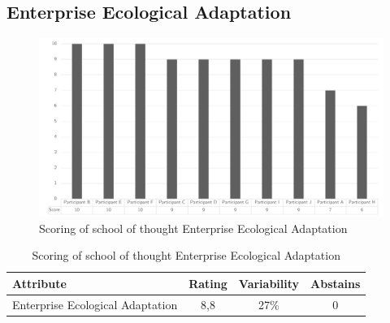 \subsection{Enterprise Ecological Adaptation}
\begin{figure}[h!]
	\centering
	\includegraphics[width=0.9\linewidth]{images/scoreeaschoolenterpriseecologicaladaptation}
	\caption[Scoring of school of thought Enterprise Ecological Adaptation]{Scoring of school of thought Enterprise Ecological Adaptation}
	\label{fig:appscoringschoolenterpriseecologicaladaptation}
\end{figure}
\begin{table}[h!]
	\centering
	\begin{tabular}{p{}ccc}
		\toprule
		\textbf{Attribute} & \textbf{Rating} & \textbf{Variability} & \textbf{Abstains} \\
		\midrule
		Enterprise Ecological Adaptation & 8,8 & 27\% & 0 \\%
		\bottomrule
	\end{tabular}%
	\caption[Scoring of school of thought Enterprise Ecological Adaptation]{Scoring of school of thought Enterprise Ecological Adaptation}
	\label{tab:appscoringschoolenterpriseecologicaladaptation}%
\end{table}%

\newpage
